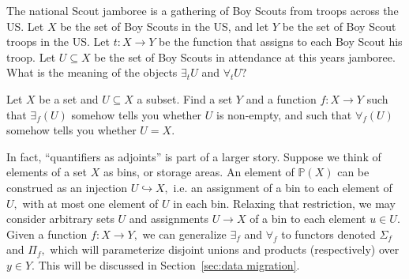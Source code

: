 \documentclass[../main/CT4S-EN-RU]{subfiles}
\begin{document}
\begin{exampleRUS}
\end{exampleRUS}

\begin{exerciseENG}
The national Scout jamboree is a gathering of Boy Scouts from troops across the US. Let $X$ be the set of Boy Scouts in the US, and let $Y$ be the set of Boy Scout troops in the US. Let $t\colon X{→} Y$ be the function that assigns to each Boy Scout his troop. Let $U\subseteq X$ be the set of Boy Scouts in attendance at this years jamboree. What is the meaning of the objects $\exists_tU$ and $\forall_tU?$
\end{exerciseENG}

\begin{exerciseRUS}
\end{exerciseRUS}

\begin{exerciseENG}
Let $X$ be a set and $U\subseteq X$ a subset. Find a set $Y$ and a function $f\colon X{→} Y$ such that $\exists_f(U)$ somehow tells you whether $U$ is non-empty, and such that $\forall_f(U)$ somehow tells you whether $U=X.$
\end{exerciseENG}

\begin{exerciseRUS}
\end{exerciseRUS}

\begin{blockENG}
In fact, “quantifiers as adjoints” is part of a larger story. Suppose we think of elements of a set $X$ as bins, or storage areas. An element of ${ℙ}(X)$ can be construed as an injection $U{↪} X,$ i.e. an assignment of a bin to each element of $U,$ with at most one element of $U$ in each bin. Relaxing that restriction, we may consider arbitrary sets $U$ and assignments $U{→} X$ of a bin to each element $u\in U.$ Given a function $f\colon X{→} Y,$ we can generalize $\exists_f$ and $\forall_f$ to functors denoted ${Σ}_f$ and ${Π}_f,$ which will parameterize disjoint unions and products (respectively) over $y\in Y.$ This will be discussed in Section~\ref{sec:data migration}.
\end{blockENG}

\begin{blockRUS}
\end{blockRUS}


\subsection{}\label{sec:universal concepts}
\end{document}
